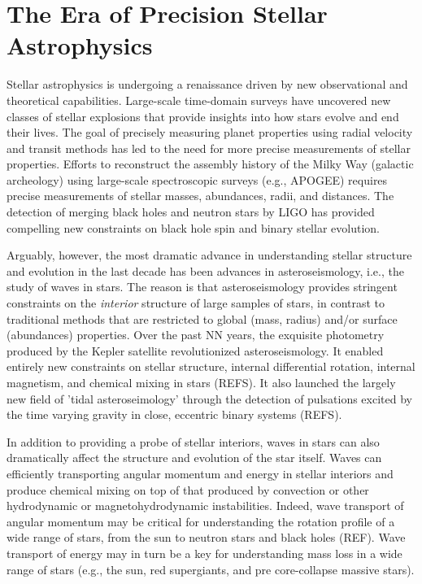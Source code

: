 \section{The Era of Precision Stellar Astrophysics}

Stellar astrophysics is undergoing a renaissance driven by new observational and theoretical capabilities. Large-scale time-domain surveys have uncovered new classes of stellar explosions that provide insights into how stars evolve and end their lives.  The goal of precisely measuring planet properties using radial velocity and transit methods has led to the need for more precise measurements of stellar properties.  Efforts to reconstruct the assembly history of the Milky Way (galactic archeology) using large-scale spectroscopic surveys (e.g., APOGEE) requires precise measurements of stellar masses, abundances, radii, and distances.   The detection of merging black holes and neutron stars by LIGO has provided compelling new constraints on black hole spin and binary stellar evolution. 

Arguably, however, the most dramatic advance in understanding stellar structure and evolution in the last decade has been advances in asteroseismology, i.e., the study of waves in stars.   The reason is that asteroseismology provides stringent constraints on the {\em interior} structure of large samples of stars, in contrast to traditional methods that are restricted to global (mass, radius) and/or surface (abundances) properties.   Over the past NN years, the exquisite photometry produced by the Kepler satellite revolutionized asteroseismology.  It enabled entirely new constraints on stellar structure, internal differential rotation, internal magnetism, and chemical mixing in stars (REFS).  It also launched the largely new field of 'tidal asteroseimology' through the detection of pulsations excited by the time varying gravity in close, eccentric binary systems (REFS). 

In addition to providing a probe of stellar interiors, waves in stars can also dramatically affect the structure and evolution of the star itself.   Waves can efficiently transporting angular momentum and energy in stellar interiors and produce chemical mixing on top of that produced by convection or other hydrodynamic or magnetohydrodynamic instabilities.   Indeed, wave transport of angular momentum may be critical for understanding the rotation profile of a wide range of stars, from the sun to neutron stars and black holes (REF).   Wave transport of energy may in turn be a key for understanding mass loss in a wide range of stars (e.g., the sun, red supergiants, and pre core-collapse massive stars).   

